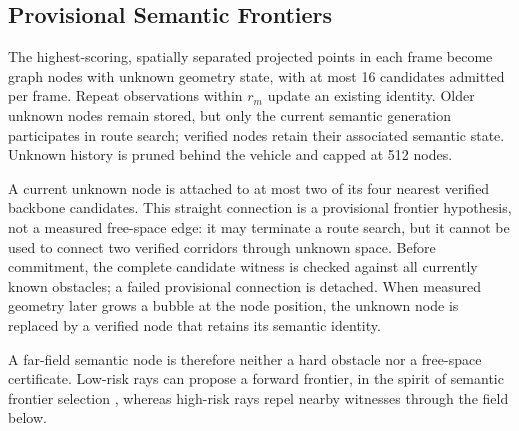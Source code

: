 \documentclass[letterpaper,10pt,conference]{ieeeconf}
\begin{document}
\subsection{Provisional Semantic Frontiers}
The highest-scoring, spatially separated projected points in each frame
become graph nodes with unknown geometry state, with at most 16 candidates
admitted per frame.  Repeat observations within $r_m$ update an existing
identity.  Older unknown nodes remain stored, but only the current semantic
generation participates in route search; verified nodes retain their
associated semantic state.  Unknown history is pruned behind the vehicle and
capped at 512 nodes.

A current unknown node is attached to at most two of its four nearest
verified backbone candidates.  This straight connection is a provisional
frontier hypothesis, not a measured free-space edge: it may terminate a route
search, but it cannot be used to connect two verified corridors through
unknown space.  Before commitment, the complete candidate witness is checked
against all currently known obstacles; a failed provisional connection is
detached.  When measured geometry later grows a bubble at the node position,
the unknown node is replaced by a verified node that retains its semantic
identity.

A far-field semantic node is therefore neither a hard obstacle nor a
free-space certificate.  Low-risk rays can propose a forward frontier, in the
spirit of semantic frontier selection \cite{vlfm,semexp}, whereas high-risk
rays repel nearby witnesses through the field below.
\end{document}
